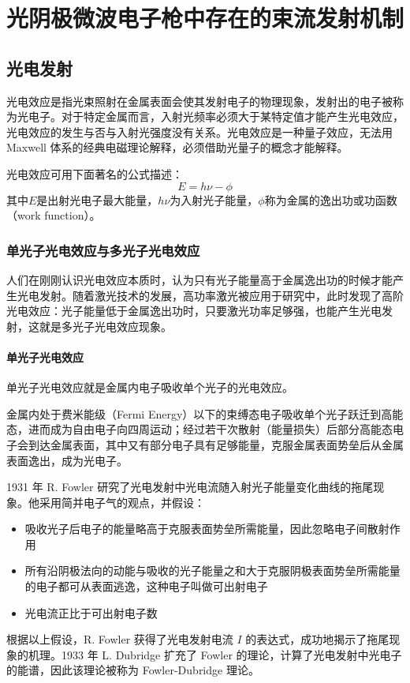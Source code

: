\section{光阴极微波电子枪中存在的束流发射机制}

\subsection{光电发射}
光电效应是指光束照射在金属表面会使其发射电子的物理现象，发射出的电子被称为光电子。对于特定金属而言，入射光频率必须大于某特定值才能产生光电效应，光电效应的发生与否与入射光强度没有关系。光电效应是一种量子效应，无法用 Maxwell 体系的经典电磁理论解释，必须借助光量子的概念才能解释。

光电效应可用下面著名的公式描述：
\[
E = h\nu-\phi
\]
其中$E$是出射光电子最大能量，$h\nu$为入射光子能量，$\phi$称为金属的逸出功或功函数（work function）。

\subsubsection{单光子光电效应与多光子光电效应}
人们在刚刚认识光电效应本质时，认为只有光子能量高于金属逸出功的时候才能产生光电发射。随着激光技术的发展，高功率激光被应用于研究中，此时发现了高阶光电效应：光子能量低于金属逸出功时，只要激光功率足够强，也能产生光电发射，这就是多光子光电效应现象。

\paragraph{单光子光电效应}
单光子光电效应就是金属内电子吸收单个光子的光电效应。

金属内处于费米能级（Fermi Energy）以下的束缚态电子吸收单个光子跃迁到高能态，进而成为自由电子向四周运动；经过若干次散射（能量损失）后部分高能态电子会到达金属表面，其中又有部分电子具有足够能量，克服金属表面势垒后从金属表面逸出，成为光电子。

1931 年 R. Fowler 研究了光电发射中光电流随入射光子能量变化曲线的拖尾现象。他采用简并电子气的观点，并假设：
	\begin{itemize}
	\item 吸收光子后电子的能量略高于克服表面势垒所需能量，因此忽略电子间散射作用
	\item 所有沿阴极法向的动能与吸收的光子能量之和大于克服阴极表面势垒所需能量的电子都可从表面逃逸，这种电子叫做可出射电子
	\item 光电流正比于可出射电子数
	\end{itemize}
	根据以上假设，R. Fowler 获得了光电发射电流 $I$ 的表达式，成功地揭示了拖尾现象的机理。1933 年 L. Dubridge 扩充了 Fowler 的理论，计算了光电发射中光电子的能谱，因此该理论被称为 Fowler-Dubridge 理论。

